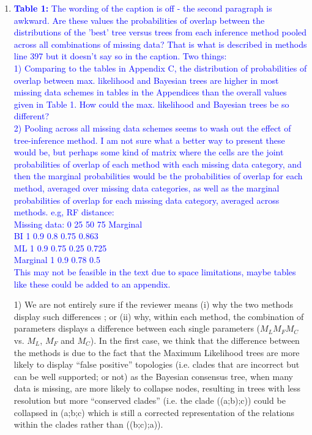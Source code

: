 \documentclass[12pt,letterpaper]{article}
\begin{document}
\begin{enumerate}
\item{\textcolor{blue}{\textbf{Table 1:} The wording of the caption is off - the second paragraph is awkward. 
Are these values the probabilities of overlap between the distributions of the 'best' tree versus trees from each inference method pooled across all combinations of missing data? That is what is described in methods line 397 but it doesn't say so in the caption.
Two things:\\
1)  Comparing to the tables in Appendix C, the distribution of probabilities of overlap between max. likelihood and Bayesian trees are higher in most missing data schemes in tables in the Appendices than the overall values given in Table 1. How could the max. likelihood and Bayesian trees be so different?\\
2)  Pooling across all missing data schemes seems to wash out the effect of tree-inference method. I am not sure what a better way to present these would be, but perhaps some kind of matrix where the cells are the joint probabilities of overlap of each method with each missing data category, and then the marginal probabilities would be the probabilities of overlap for each method, averaged over missing data categories, as well as the marginal probabilities of overlap for each missing data category, averaged across methods.  e.g, RF distance:\\
Missing data:   0   25  50      75      Marginal \\
BI              1   0.9 0.8     0.75    0.863 \\
ML              1   0.9 0.75    0.25    0.725 \\
Marginal        1   0.9 0.78    0.5     \\
This may not be feasible in the text due to space limitations, maybe tables like these could be added to an appendix.}}


1) We are not entirely sure if the reviewer means (i) why the two methods display such differences ; or (ii) why, within each method, the combination of parameters displays a difference between each single parameters ($M_LM_FM_C$ vs. $M_L$, $M_F$ and $M_C$).
In the first case, we think that the difference between the methods is due to the fact that the Maximum Likelihood trees are more likely to display ``false positive'' topologies (i.e. clades that are incorrect but can be well supported; or not) as the Bayesian consensus tree, when many data is missing, are more likely to collapse nodes, resulting in trees with less resolution but more ``conserved clades'' (i.e. the clade ((a;b);c)) could be collapsed in (a;b;c) which is still a corrected representation of the relations within the clades rather than ((b;c);a)).


\end{enumerate}
\end{document}
